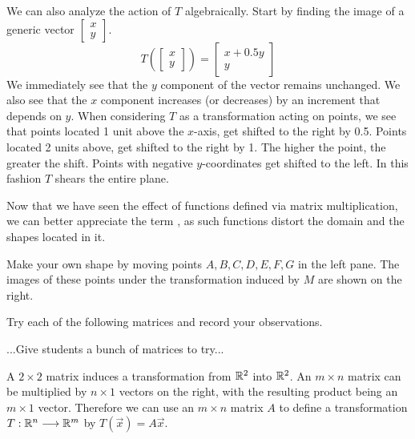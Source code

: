 \documentclass{ximera}
\begin{document}
We can also analyze the action of $T$ algebraically.  Start by finding the image of a generic vector $\begin{bmatrix}x\\y\end{bmatrix}$.
$$T\left(\begin{bmatrix}x\\y\end{bmatrix}\right)=\begin{bmatrix}x+0.5y\\y\end{bmatrix}$$
We immediately see that the $y$ component of the vector remains unchanged.  We also see that the $x$ component increases (or decreases) by an increment that depends on $y$.  When considering $T$ as a transformation acting on points, we see that points located 1 unit above the $x$-axis, get shifted to the right by 0.5.  Points located 2 units above, get shifted to the right by 1. The higher the point, the greater the shift.  Points with negative $y$-coordinates get shifted to the left. In this fashion $T$ shears the entire plane.

 Now that we have seen the effect of functions defined via matrix multiplication, we can better appreciate the term , as such functions distort the domain and the shapes located in it.

\begin{exploration}
Make your own shape by moving points $A, B, C, D, E, F, G$ in the left pane.  The images of these points under the transformation induced by $M$ are shown on the right.

Try each of the following matrices and record your observations.

...Give students a bunch of matrices to try...
    \begin{center}
\end{center}
\end{exploration}




 

A $2\times 2$ matrix induces a transformation from $\mathbb{R}^2$ into $\mathbb{R}^2$.  An $m\times n$ matrix can be multiplied by $n\times 1$ vectors on the right, with the resulting product being an $m\times 1$ vector.  Therefore we can use an $m\times n$ matrix $A$ to define a transformation $T:\mathbb{R}^n\longrightarrow \mathbb{R}^m$ by $T(\vec{x})=A\vec{x}$.
\end{document}
